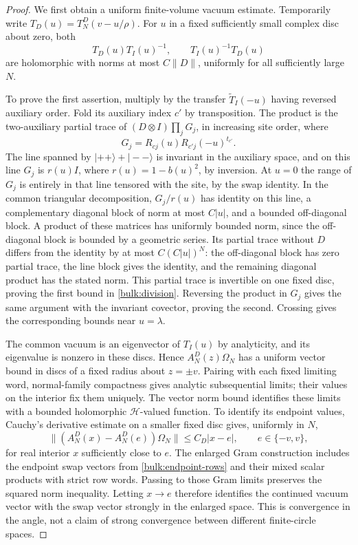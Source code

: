 \begin{proof}
We first obtain a uniform finite-volume vacuum estimate. Temporarily
write $T_D(u)=T_N^D(v-u/\rho)$. For $u$ in a fixed sufficiently
small complex disc about zero, both
\begin{equation}\label{bulk:division}
 T_D(u)T_I(u)^{-1},\qquad T_I(u)^{-1}T_D(u)
\end{equation}
are holomorphic with norms at most $C\|D\|$, uniformly for all
sufficiently large $N$.

To prove the first assertion, multiply by the transfer
$\widetilde T_I(-u)$ having reversed auxiliary order. Fold its
auxiliary index $c'$ by transposition. The product is the
two-auxiliary partial trace of
$(D\otimes I)\prod_jG_j$, in increasing site order, where
\[
 G_j=R_{cj}(u)R_{c'j}(-u)^{t_{c'}}.
\]
The line spanned by $|++\rangle+|--\rangle$ is invariant in the
auxiliary space, and on this line $G_j$ is
$r(u)I$, where $r(u)=1-b(u)^2$, by inversion. At $u=0$ the range
of $G_j$ is entirely in that line tensored with the site, by the
swap identity. In the common triangular decomposition, $G_j/r(u)$
has identity on this line, a complementary diagonal block of
norm at most $C|u|$, and a bounded off-diagonal block. A product of
these matrices has uniformly bounded norm, since the
off-diagonal block is bounded by a geometric series. Its partial
trace without $D$ differs from the identity by at most
$C(C|u|)^N$: the off-diagonal block has zero partial trace, the
line block gives the identity, and the remaining diagonal product
has the stated norm. This partial trace is invertible on one
fixed disc, proving the first bound in \eqref{bulk:division}.
Reversing the product in $G_j$ gives the same argument with the
invariant covector, proving the second. Crossing gives the
corresponding bounds near $u=\lambda$.

The common vacuum is an eigenvector of $T_I(u)$ by analyticity,
and its eigenvalue is nonzero in these discs. Hence
$A_N^D(z)\Omega_N$ has a uniform vector bound in discs of a fixed
radius about $z=\pm v$. Pairing with each fixed limiting word,
normal-family compactness gives analytic subsequential limits;
their values on the interior fix them uniquely. The vector norm
bound identifies these limits with a bounded holomorphic
$\mathcal H$-valued function. To identify its endpoint values, Cauchy's
derivative estimate on a smaller fixed disc gives, uniformly in $N$,
\[
 \bigl\|(A_N^D(x)-A_N^D(e))\Omega_N\bigr\|
 \le C_D|x-e|,\qquad e\in\{-v,v\},
\]
for real interior $x$ sufficiently close to $e$. The enlarged Gram
construction includes the endpoint swap vectors from
\eqref{bulk:endpoint-rows} and their mixed scalar products with strict
row words. Passing to those Gram limits preserves the squared norm
inequality. Letting $x\to e$ therefore identifies the continued vacuum
vector with the swap vector strongly in the enlarged space. This is
convergence in the angle, not a claim of strong convergence between
different finite-circle spaces.


\end{proof}
